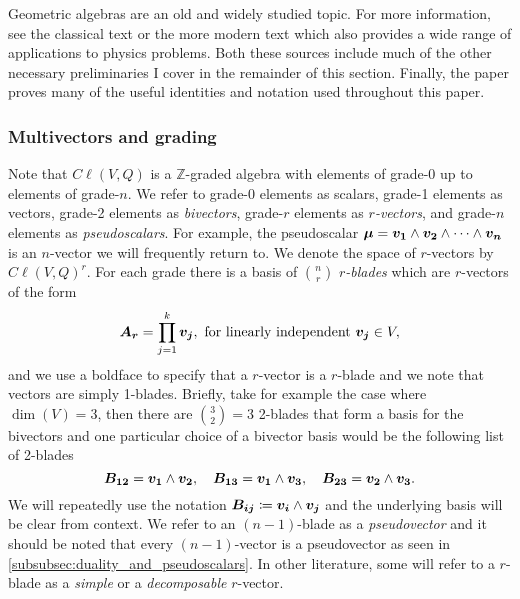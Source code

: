 Geometric algebras are an old and widely studied topic. For more information, see the classical text \cite{hestenes_clifford_1986} or the more modern text \cite{doran_geometric_2003} which also provides a wide range of applications to physics problems. Both these sources include much of the other necessary preliminaries I cover in the remainder of this section. Finally, the paper \cite{chisolm_geometric_2012} proves many of the useful identities and notation used throughout this paper.

\subsubsection{Multivectors and grading}
Note that $C\ell(V,Q)$ is a $\mathbb{Z}$-graded algebra with elements of grade-0 up to elements of grade-$n$. We refer to grade-0 elements as scalars, grade-1 elements as vectors, grade-2 elements as \emph{bivectors}, grade-$r$ elements as \emph{$r$-vectors}, and grade-$n$ elements as \emph{pseudoscalars}. For example, the pseudoscalar $\boldsymbol{\mu} = \boldsymbol{v_1} \wedge \boldsymbol{v_2} \wedge \cdots \wedge \boldsymbol{v_n}$ is an $n$-vector we will frequently return to. We denote the space of $r$-vectors by $C\ell(V,Q)^r$. For each grade there is a basis of ${n\choose r}$ \emph{$r$-blades} which are $r$-vectors of the form
\begin{equation}
\boldsymbol{A_r} = \prod_{j=1}^k \boldsymbol{v_j}, ~\textrm{for linearly independent}~ \boldsymbol{v_j} \in V,
\end{equation}
and we use a boldface to specify that a $r$-vector is a $r$-blade and we note that vectors are simply 1-blades. Briefly, take for example the case where $\dim(V)=3$, then there are ${3\choose 2}=3$ 2-blades that form a basis for the bivectors and one particular choice of a bivector basis would be the following list of 2-blades
\begin{equation}
\label{eq:3_dim_basis}
\boldsymbol{B_{12}} = \boldsymbol{v_1} \wedge \boldsymbol{v_2}, \quad \boldsymbol{B_{13}} = \boldsymbol{v_1} \wedge \boldsymbol{v_3}, \quad \boldsymbol{B_{23}} = \boldsymbol{v_2} \wedge \boldsymbol{v_3}.
\end{equation}
We will repeatedly use the notation $\boldsymbol{B_{ij}} \coloneqq \boldsymbol{v_i}\wedge \boldsymbol{v_j}$ and the underlying basis will be clear from context. We refer to an $(n-1)$-blade as a \emph{pseudovector} and it should be noted that every $(n-1)$-vector is a pseudovector as seen in \cref{subsubsec:duality_and_pseudoscalars}. In other literature, some will refer to a $r$-blade as a \emph{simple} or a \emph{decomposable} $r$-vector. 

